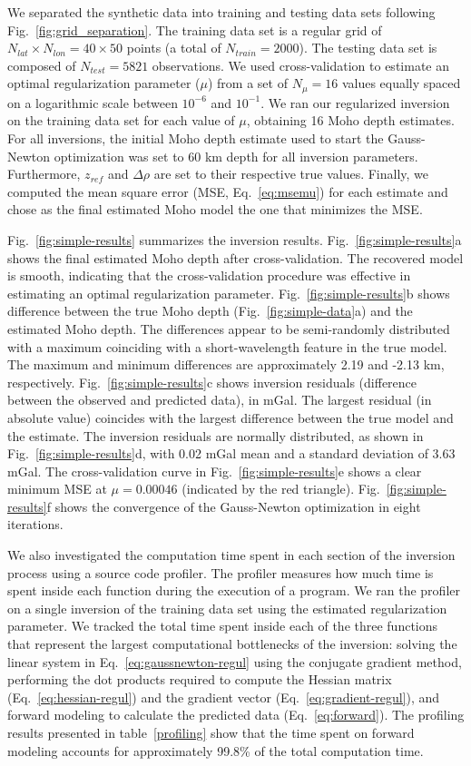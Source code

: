 \documentclass[extra]{gji}
\begin{document}
We separated the synthetic data into training and testing data sets
following Fig.~\ref{fig:grid_separation}.
The training data set is a regular grid of
$N_{lat} \times N_{lon} = 40 \times 50$ points
(a total of $N_{train} = 2000$).
The testing data set is composed of $N_{test} = 5821$ observations.
We used cross-validation to estimate an optimal regularization parameter ($\mu$)
from a set of $N_\mu = 16$ values equally spaced on a logarithmic scale
between $10^{-6}$ and $10^{-1}$.
We ran our regularized inversion on the training data set
for each value of $\mu$,
obtaining 16 Moho depth estimates.
For all inversions, the initial Moho depth estimate
used to start the Gauss-Newton optimization
was set to 60 km depth for all inversion parameters.
Furthermore, $z_{ref}$ and $\Delta\rho$ are set to their respective true values.
Finally, we computed the mean square error (MSE, Eq.~\ref{eq:msemu})
for each estimate and chose as the final estimated Moho model
the one that minimizes the MSE.

Fig.~\ref{fig:simple-results} summarizes the inversion results.
Fig.~\ref{fig:simple-results}a shows the final estimated Moho depth
after cross-validation.
The recovered model is smooth, indicating that the cross-validation procedure
was effective in estimating an optimal regularization parameter.
Fig.~\ref{fig:simple-results}b shows difference between the true Moho depth
(Fig.~\ref{fig:simple-data}a) and the estimated Moho depth.
The differences appear to be semi-randomly distributed with a maximum
coinciding with a short-wavelength feature in the true model.
The maximum and minimum differences are approximately
2.19 and -2.13 km, respectively.
Fig.~\ref{fig:simple-results}c shows inversion residuals (difference between
the observed and predicted data), in mGal.
The largest residual (in absolute value) coincides with the largest difference
between the true model and the estimate.
The inversion residuals are normally distributed,
as shown in Fig.~\ref{fig:simple-results}d,
with 0.02 mGal mean and a standard deviation of 3.63 mGal.
The cross-validation curve in Fig.~\ref{fig:simple-results}e
shows a clear minimum MSE at $\mu = 0.00046$
(indicated by the red triangle).
Fig.~\ref{fig:simple-results}f shows the convergence of
the Gauss-Newton optimization in eight iterations.

We also investigated the computation time spent in each section of the inversion
process using a source code profiler.
The profiler measures how much time is spent inside each function during
the execution of a program.
We ran the profiler on a single inversion of the training data set
using the estimated regularization parameter.
We tracked the total time spent inside each of the three functions
that represent the largest computational bottlenecks of the inversion:
solving the linear system in Eq.~\ref{eq:gaussnewton-regul}
using the conjugate gradient method,
performing the dot products required to compute
the Hessian matrix (Eq.~\ref{eq:hessian-regul})
and the gradient vector (Eq.~\ref{eq:gradient-regul}),
and forward modeling to calculate the predicted data (Eq.~\ref{eq:forward}).
The profiling results presented in table~\ref{profiling}
show that the time spent on forward modeling accounts for approximately
99.8\% of the total computation time.
\end{document}
